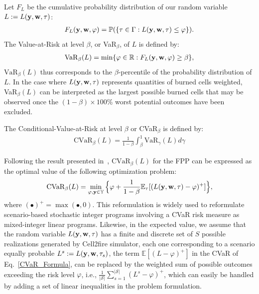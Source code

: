 \documentclass[a4paper,fleqn]{cas-sc}
\begin{document}
Let $F_L$ be the cumulative probability distribution of our random variable $L := L(\vb{y}, \vb{w}, \tau)$:
\begin{align}
    F_L(\vb{y}, \vb{w}, \varphi) = \mathbb{P}( \{ \tau \in \Gamma : L(\vb{y}, \vb{w}, \tau) \leq \varphi \}).
\end{align}
The Value-at-Risk at level $\beta$, or VaR$_{\beta}$, of  $L$ is defined by:
\begin{align}
    \text{VaR}_{\beta}(L)= \min \{\varphi \in \mathbb{R} : F_L(\vb{y}, \vb{w},\varphi) \geq \beta\}, 
\end{align}
$\text{VaR}_\beta(L)$ thus corresponds to the  $\beta$-percentile of the probability distribution of $L$. In the case where $L(\vb{y}, \vb{w}, \tau)$ represents quantities of burned cells weighted, VaR$_\beta(L)$ can be interpreted as the largest possible burned cells that may be observed once the $(1-\beta)\times 100 $\% worst potential outcomes have been excluded.  

\noindent The  Conditional-Value-at-Risk at level $\beta$ or CVaR$_{\beta}$ is defined  by:
\begin{align}
\text{CVaR}_\beta(L)= \frac{1}{1-\beta} \int_{\beta}^{1} \text{VaR}_{\gamma}(L) d\gamma
\end{align}

Following the result presented in~\cite{rockafellar2000optimization}, $\text{CVaR}_\beta(L)$ for the FPP can be expressed as the optimal value of the following optimization problem:
\begin{align}
\text{CVaR}_\beta(L) = \min \limits_{\varphi, \vb{y} \in \mathbb{Y}  } \Big \{ \varphi + \frac{1}{1- \beta} \mathbb{E}_\tau[(L(\vb{y}, \vb{w}, \tau) - \varphi)^+] \Big \},
\label{CVaR_Formula}
\end{align}
where $( \bullet )^+ = \max(\bullet, 0)$. This reformulation is widely used to reformulate scenario-based stochastic integer programs involving a CVaR risk measure as mixed-integer linear programs. Likewise, in the expected value, we assume that the random variable $L(\vb{y}, \vb{w},\tau)$ has a finite and discrete set of $S$ possible realizations generated by Cell2fire simulator, each one corresponding to a scenario equally probable $L^s:=L(\vb{y}, \vb{w}, \tau_s)$, the term $\mathbb{E}[(L - \varphi)^+]$ in the CVaR of Eq.~\eqref{CVaR_Formula}, can be replaced by the weighted sum of possible outcomes exceeding the risk level $\varphi$, i.e., $\frac{1}{\lvert \mathcal{S}\vert}\sum_{s=1}^{\lvert \mathcal{S}\vert} (L^s - \varphi)^+$, which can easily be handled by adding a set of linear inequalities in the problem formulation. 
\end{document}
